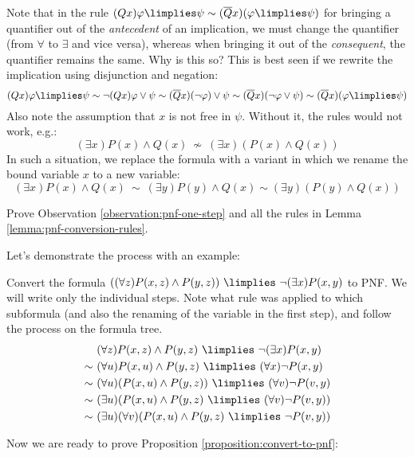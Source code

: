 Note that in the rule $(Qx)\varphi \limplies \psi\sim(\overline{Q}x)(\varphi \limplies \psi)$ for bringing a quantifier out of the \emph{antecedent} of an implication, we must change the quantifier (from $\forall$ to $\exists$ and vice versa), whereas when bringing it out of the \emph{consequent}, the quantifier remains the same. Why is this so? This is best seen if we rewrite the implication using disjunction and negation:
$$
(Qx)\varphi \limplies \psi\sim\neg(Qx)\varphi \lor\psi\sim(\overline{Q}x)(\neg\varphi)\lor\psi\sim(\overline{Q}x)(\neg\varphi\lor\psi)\sim (\overline{Q}x)(\varphi \limplies \psi)
$$
Also note the assumption that $x$ is not free in $\psi$. Without it, the rules would not work, e.g.:
$$
(\exists x)P(x)\land Q(x)\ \not\sim\ (\exists x)(P(x)\land Q(x))
$$
In such a situation, we replace the formula with a variant in which we rename the bound variable $x$ to a new variable:
$$
(\exists x)P(x)\land Q(x)\ \sim\ (\exists y)P(y)\land Q(x) \sim (\exists y)(P(y)\land Q(x))
$$
\begin{exercise}
    Prove Observation \ref{observation:pnf-one-step} and all the rules in Lemma \ref{lemma:pnf-conversion-rules}.
\end{exercise}

Let's demonstrate the process with an example:

\begin{example}\label{example:convert-to-pnf}
    Convert the formula $((\forall z)P(x,z)\land P(y,z))\ \limplies\ \neg(\exists x)P(x,y)$ to PNF. We will write only the individual steps. Note what rule was applied to which subformula (and also the renaming of the variable in the first step), and follow the process on the formula tree.
    \begin{align*}
        &\ (\forall z)P(x,z)\land P(y,z)\ \limplies\ \neg(\exists x)P(x,y)\\ \sim &\ 
        (\forall u) P(x,u)\land P(y,z)\ \limplies\ (\forall x)\neg P(x,y)\\ \sim &\ 
        (\forall u)(P(x,u)\land P(y,z))\ \limplies\ (\forall v)\neg P(v,y)\\ \sim &\ 
        (\exists u)( P(x,u)\land P(y,z)\ \limplies\ (\forall v)\neg P(v,y))\\ \sim &\ 
        (\exists u)(\forall v)( P(x,u)\land P(y,z)\ \limplies\ \neg P(v,y))
    \end{align*}    
\end{example}

Now we are ready to prove Proposition \ref{proposition:convert-to-pnf}:

